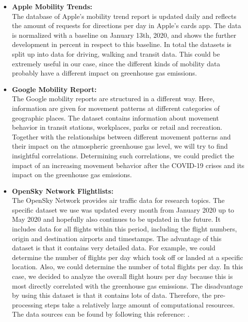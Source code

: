 \begin{itemize}
\item \textbf{Apple Mobility Trends:} \\
The database of Apple's mobility trend report is updated daily and reflects the amount of requests for directions per day in Apple's cards app.\cite{Apple} The data is normalized with a baseline on January 13th, 2020, and shows the further development in percent in respect to this baseline. In total the datasets is split up into data for driving, walking and transit data. This could be extremely useful in our case, since the different kinds of mobility data probably have a different impact on greenhouse gas emissions.

\item \textbf{Google Mobility Report:} \\
The Google mobility reports are structured in a different way. Here, information are given for movement patterns at different categories of geographic places.\cite{Google} The dataset contains information about movement behavior in transit stations, workplaces, parks or retail and recreation. Together with the relationships between different movement patterns and their impact on the atmospheric greenhouse gas level, we will try to find insightful correlations. Determining such correlations, we could predict the impact of an increasing movement behavior after the COVID-19 crises and its impact on the greenhouse gas emissions.

\item \textbf{OpenSky Network Flightlists:}\\
The OpenSky Network provides air traffic data for research topics. The specific dataset we use was updated every month from January 2020 up to May 2020 and hopefully also continues to be updated in the future. It includes data for all flights within this period, including the flight numbers, origin and destination airports and timestamps. The advantage of this dataset is that it contains very detailed data. For example, we could determine the number of flights per day which took off or landed at a specific location. Also, we could determine the number of total flights per day. In this case, we decided to analyze the overall flight hours per day because this is most directly correlated with the greenhouse gas emissions. The disadvantage by using this dataset is that it contains lots of data. Therefore, the pre-processing steps take a relatively large amount of computational resources. The data sources can be found by following this reference: \cite{Opensky}.


\end{itemize}
